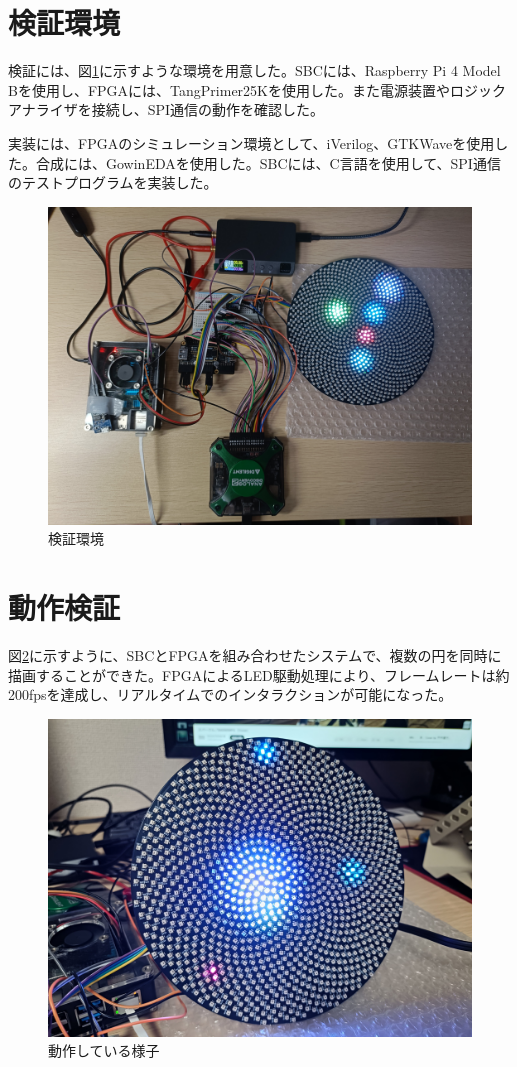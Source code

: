 \documentclass[a4paper,11pt, twocolumn]{ltjsarticle}
\begin{document}
\section{検証環境}
検証には、図\ref{fig:kensyo}に示すような環境を用意した。SBCには、Raspberry Pi 4 Model Bを使用し、FPGAには、TangPrimer25Kを使用した。また電源装置やロジックアナライザを接続し、SPI通信の動作を確認した。

実装には、FPGAのシミュレーション環境として、iVerilog、GTKWaveを使用した。合成には、GowinEDAを使用した。SBCには、C言語を使用して、SPI通信のテストプログラムを実装した。

\begin{figure}
\centering
\includegraphics[width=0.8\columnwidth]{test.jpg}
\caption{検証環境}
\label{fig:kensyo}
\end{figure}

\section{動作検証}
図\ref{fig:dousa}に示すように、SBCとFPGAを組み合わせたシステムで、複数の円を同時に描画することができた。FPGAによるLED駆動処理により、フレームレートは約200fpsを達成し、リアルタイムでのインタラクションが可能になった。

\begin{figure}
\centering
\includegraphics[width=0.8\columnwidth]{dousa.jpg}
\caption{動作している様子}
\label{fig:dousa}
\end{figure}
\end{document}
